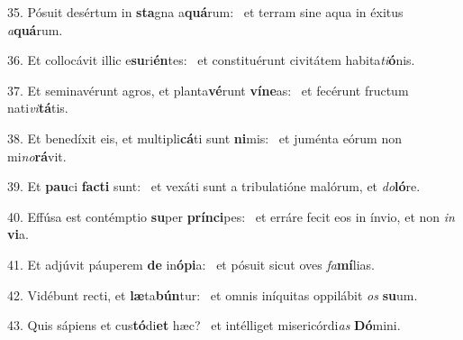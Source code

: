 35. Pósuit desértum in \textbf{sta}gna a\textbf{quá}rum: \ast\  et terram sine aqua in éxitus \textit{a}\textbf{quá}rum.\

36. Et collocávit illic e\textbf{su}ri\textbf{én}tes: \ast\  et constituérunt civitátem habita\textit{ti}\textbf{ó}nis.\

37. Et seminavérunt agros, et planta\textbf{vé}runt \textbf{ví}\textbf{ne}as: \ast\  et fecérunt fructum nati\textit{vi}\textbf{tá}tis.\

38. Et benedíxit eis, et multipli\textbf{cá}ti sunt \textbf{ni}mis: \ast\  et juménta eórum non mi\textit{no}\textbf{rá}vit.\

39. Et \textbf{pau}ci \textbf{fac}\textbf{ti} sunt: \ast\  et vexáti sunt a tribulatióne malórum, et \textit{do}\textbf{ló}re.\

40. Effúsa est contémptio \textbf{su}per \textbf{prín}\textbf{ci}pes: \ast\  et erráre fecit eos in ínvio, et non \textit{in} \textbf{vi}a.\

41. Et adjúvit páuperem \textbf{de} in\textbf{ó}\textbf{pi}a: \ast\  et pósuit sicut oves \textit{fa}\textbf{mí}lias.\

42. Vidébunt recti, et \textbf{læ}ta\textbf{bún}tur: \ast\  et omnis iníquitas oppilábit \textit{os} \textbf{su}um.\

43. Quis sápiens et cus\textbf{tó}di\textbf{et} hæc? \ast\  et intélliget misericórdi\textit{as} \textbf{Dó}mini.\

